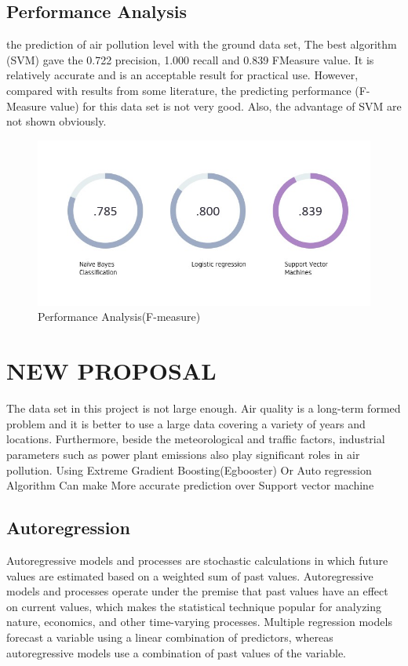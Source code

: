 \section{Performance Analysis}
the prediction of air pollution level with the ground data set, The best algorithm (SVM) gave the 0.722 precision, 1.000 recall and 0.839 FMeasure value. It is relatively accurate and is an acceptable result for practical use. However, compared with results from some literature, the predicting performance (F-Measure value) for this data set is not very good. Also, the advantage of SVM are not shown obviously.

\begin{figure}[h]
	\label{ss}    %
	\centering
	\includegraphics[width= 11 cm]{8.jpg}
	\caption{Performance Analysis(F-measure) }
\end{figure}	

\chapter{NEW PROPOSAL}

The data set in this project is not large enough. Air quality is a long-term formed problem and it is better to use a large data covering a variety of years and locations. Furthermore, beside the meteorological and traffic factors, industrial parameters such as power plant emissions also play significant roles in air pollution. Using Extreme Gradient Boosting(Egbooster) Or Auto regression Algorithm  Can make More accurate prediction over Support vector machine


\section{Autoregression}

Autoregressive models and processes are stochastic calculations in which future values are estimated based on a weighted sum of past values. Autoregressive models and processes operate under the premise that past values have an effect on current values, which makes the statistical technique popular for analyzing nature, economics, and other time-varying processes. Multiple regression models forecast a variable using a linear combination of predictors, whereas autoregressive models use a combination of past values of the variable.

